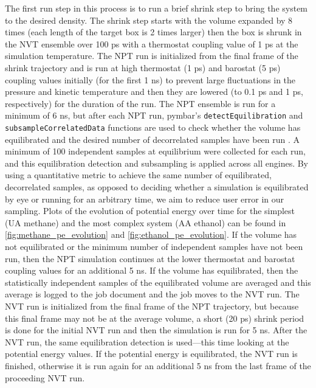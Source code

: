 The first run step in this process is to run a brief shrink step to bring the system to the desired density. 
The shrink step starts with the volume expanded by 8 times (each length of the target box is 2 times larger) then the box is shrunk in the NVT ensemble over 100 ps with a thermostat coupling value of 1 ps at the simulation temperature. 
The NPT run is initialized from the final frame of the shrink trajectory and is run at high thermostat (1 ps) and barostat (5 ps) coupling values initially (for the first 1 ns) to prevent large fluctuations in the pressure and kinetic temperature and then they are lowered (to 0.1 ps and 1 ps, respectively) for the duration of the run. %
The NPT ensemble is run for a minimum of 6 ns, but after each NPT run, pymbar's \lstinline{detectEquilibration} and \lstinline{subsampleCorrelatedData} functions are used to check whether the volume has equilibrated and the desired number of decorrelated samples have been run \cite{Chodera2007, Chodera2016, Shirts2008a}. 
A minimum of 100 independent samples at equilibrium were collected for each run, and this equilibration detection and subsampling is applied across all engines.
By using a quantitative metric to achieve the same number of equilibrated, decorrelated samples, as opposed to deciding whether a simulation is equilibrated by eye or running for an arbitrary time, we aim to reduce user error in our sampling.
Plots of the evolution of potential energy over time for the simplest (UA methane) and the most complex system (AA ethanol) can be found in \autoref{fig:methane_pe_evolution} and \autoref{fig:ethanol_pe_evolution}.
If the volume has not equilibrated or the minimum number of independent samples have not been run, then the NPT simulation continues at the lower thermostat and barostat coupling values for an additional 5 ns. 
If the volume has equilibrated, then the statistically independent samples of the equilibrated volume are averaged and this average is logged to the job document and the job moves to the NVT run. 
The NVT run is initialized from the final frame of the NPT trajectory, but because this final frame may not be at the average volume, a short (20 ps) shrink period is done for the initial NVT run and then the simulation is run for 5 ns. 
After the NVT run, the same equilibration detection is used---this time looking at the potential energy values. If the potential energy is equilibrated, the NVT run is finished, otherwise it is run again for an additional 5 ns from the last frame of the proceeding NVT run. 

